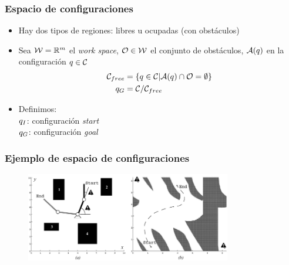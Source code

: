 \begin{frame}
	\frametitle{Espacio de configuraciones}
	\begin{itemize}
		\item Hay dos tipos de regiones: libres u ocupadas (con obstáculos)
		\item Sea $\mathcal{W} = \mathbb{R}^{m}$ el \emph{work space}, $\mathcal{O} \in \mathcal{W}$ el conjunto de obstáculos, $\mathcal{A}(q)$ en la configuración $q \in \mathcal{C}$
		\begin{align*}
			 \mathcal{C}_{free} &= \left\lbrace q \in \mathcal{C} | \mathcal{A}(q) \cap \mathcal{O} =  \emptyset \right\rbrace\\
			 q_{G} &= \mathcal{C} / \mathcal{C}_{free}
		\end{align*}
	
		\item Definimos:\\
		$q_{I}$: configuración \emph{start}\\
		$q_{G}$: configuración \emph{goal}
		
	
	\end{itemize}
	
\end{frame}

\begin{frame}
	\frametitle{Ejemplo de espacio de configuraciones}
	
	\begin{figure}[!h]
		\includegraphics[width=0.8\textwidth]{images/configuration_space_manipulator.pdf}
	\end{figure}
	
\end{frame}

